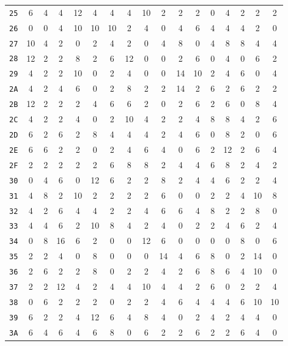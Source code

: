 \documentclass[12pt,a4paper]{article}
\begin{document}
\begin{center}
\begin{small}
\begin{longtable}{c|cccccccccccccccc}
\texttt{25} & 6 & 4 & 4 & 12 & 4 & 4 & 4 & 10 & 2 & 2 & 2 & 0 & 4 & 2 & 2 & 2 \\
\texttt{26} & 0 & 0 & 4 & 10 & 10 & 10 & 2 & 4 & 0 & 4 & 6 & 4 & 4 & 4 & 2 & 0 \\
\texttt{27} & 10 & 4 & 2 & 0 & 2 & 4 & 2 & 0 & 4 & 8 & 0 & 4 & 8 & 8 & 4 & 4 \\
\texttt{28} & 12 & 2 & 2 & 8 & 2 & 6 & 12 & 0 & 0 & 2 & 6 & 0 & 4 & 0 & 6 & 2 \\
\texttt{29} & 4 & 2 & 2 & 10 & 0 & 2 & 4 & 0 & 0 & 14 & 10 & 2 & 4 & 6 & 0 & 4 \\
\texttt{2A} & 4 & 2 & 4 & 6 & 0 & 2 & 8 & 2 & 2 & 14 & 2 & 6 & 2 & 6 & 2 & 2 \\
\texttt{2B} & 12 & 2 & 2 & 2 & 4 & 6 & 6 & 2 & 0 & 2 & 6 & 2 & 6 & 0 & 8 & 4 \\
\texttt{2C} & 4 & 2 & 2 & 4 & 0 & 2 & 10 & 4 & 2 & 2 & 4 & 8 & 8 & 4 & 2 & 6 \\
\texttt{2D} & 6 & 2 & 6 & 2 & 8 & 4 & 4 & 4 & 2 & 4 & 6 & 0 & 8 & 2 & 0 & 6 \\
\texttt{2E} & 6 & 6 & 2 & 2 & 0 & 2 & 4 & 6 & 4 & 0 & 6 & 2 & 12 & 2 & 6 & 4 \\
\texttt{2F} & 2 & 2 & 2 & 2 & 2 & 6 & 8 & 8 & 2 & 4 & 4 & 6 & 8 & 2 & 4 & 2 \\
\texttt{30} & 0 & 4 & 6 & 0 & 12 & 6 & 2 & 2 & 8 & 2 & 4 & 4 & 6 & 2 & 2 & 4 \\
\texttt{31} & 4 & 8 & 2 & 10 & 2 & 2 & 2 & 2 & 6 & 0 & 0 & 2 & 2 & 4 & 10 & 8 \\
\texttt{32} & 4 & 2 & 6 & 4 & 4 & 2 & 2 & 4 & 6 & 6 & 4 & 8 & 2 & 2 & 8 & 0 \\
\texttt{33} & 4 & 4 & 6 & 2 & 10 & 8 & 4 & 2 & 4 & 0 & 2 & 2 & 4 & 6 & 2 & 4 \\
\texttt{34} & 0 & 8 & 16 & 6 & 2 & 0 & 0 & 12 & 6 & 0 & 0 & 0 & 0 & 8 & 0 & 6 \\
\texttt{35} & 2 & 2 & 4 & 0 & 8 & 0 & 0 & 0 & 14 & 4 & 6 & 8 & 0 & 2 & 14 & 0 \\
\texttt{36} & 2 & 6 & 2 & 2 & 8 & 0 & 2 & 2 & 4 & 2 & 6 & 8 & 6 & 4 & 10 & 0 \\
\texttt{37} & 2 & 2 & 12 & 4 & 2 & 4 & 4 & 10 & 4 & 4 & 2 & 6 & 0 & 2 & 2 & 4 \\
\texttt{38} & 0 & 6 & 2 & 2 & 2 & 0 & 2 & 2 & 4 & 6 & 4 & 4 & 4 & 6 & 10 & 10 \\
\texttt{39} & 6 & 2 & 2 & 4 & 12 & 6 & 4 & 8 & 4 & 0 & 2 & 4 & 2 & 4 & 4 & 0 \\
\texttt{3A} & 6 & 4 & 6 & 4 & 6 & 8 & 0 & 6 & 2 & 2 & 6 & 2 & 2 & 6 & 4 & 0 \\

\end{longtable}
\end{small}
\end{center}
\end{document}
